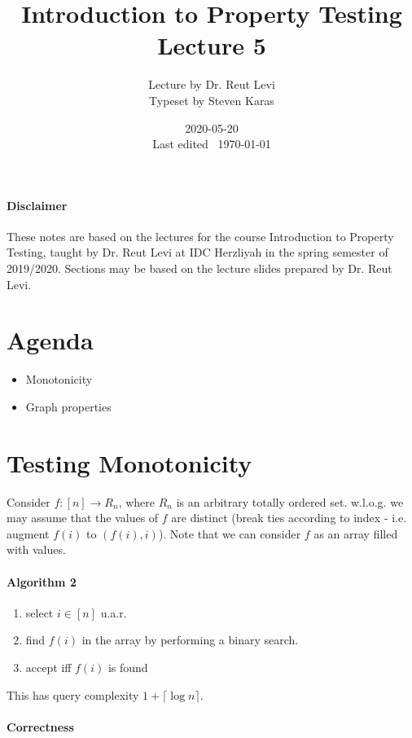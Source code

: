 \documentclass{idc_msc}
\title{Introduction to Property Testing \\\large Lecture 5}
\date{2020-05-20 \\ Last edited \currenttime\ \today}
\author{Lecture by Dr. Reut Levi\\Typeset by Steven Karas}
\begin{document}
\nocite{goldreich2017introduction}

\paragraph{Disclaimer}

These notes are based on the lectures for the course Introduction to Property Testing, taught by Dr. Reut Levi at IDC Herzliyah in the spring semester of 2019/2020.
Sections may be based on the lecture slides prepared by Dr. Reut Levi.

\section{Agenda}

  \begin{itemize}
    \item Monotonicity
    \item Graph properties
  \end{itemize}


\section{Testing Monotonicity}

Consider \(f : [n] \to R_n\), where \(R_n\) is an arbitrary totally ordered set.
w.l.o.g. we may assume that the values of \(f\) are distinct (break ties according to index - i.e. augment \(f(i)\) to \((f(i), i)\)).
Note that we can consider \(f\) as an array filled with values.

\paragraph{Algorithm 2}

\begin{enumerate}
  \item select \(i \in [n]\) u.a.r.
  \item find \(f(i)\) in the array by performing a binary search.
  \item accept iff \(f(i)\) is found
\end{enumerate}

This has query complexity \(1 + \lceil\log n\rceil\).

\paragraph{Correctness}
\end{document}
